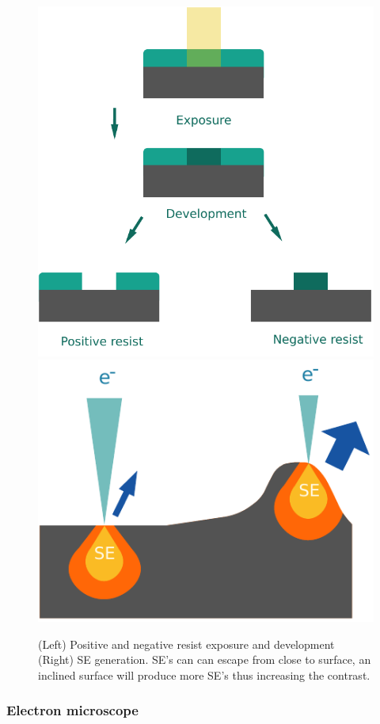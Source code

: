 \documentclass[final]{jyflluk}
\begin{document}
\begin{figure}[hb]%
    \centering
    \includegraphics[width=.40\linewidth]{images/pos_neg_resist.pdf}\quad\includegraphics[width=.43\linewidth]{images/SE.pdf}
    \qquad
    \begin{minipage}{1.2in}
    \end{minipage}%
    \caption{(Left) Positive and negative resist exposure and development (Right) SE generation. SE's can can escape from close to surface, an inclined surface will produce more SE's thus increasing the contrast.}%
    \label{fig:SEM}%
\end{figure}

\subsubsection{Electron microscope}
\end{document}
